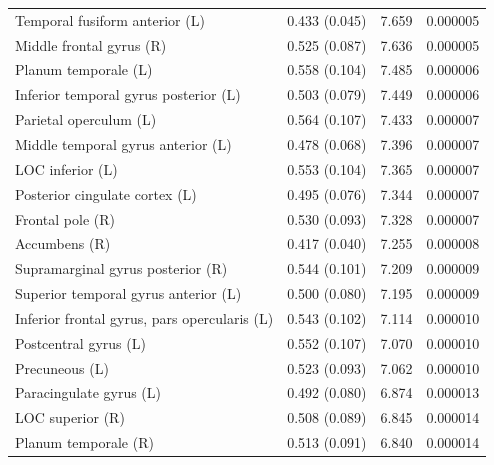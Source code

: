 \documentclass[jou,12pt,a4paper]{apa6}
\begin{document}
\begin{table}[ht]
\begin{threeparttable}
\begin{tabular*}{1\textwidth}{l @{\extracolsep{\fill}} lll}
Temporal fusiform anterior (L)      & 0.433 (0.045)               & 7.659            & 0.000005         \\
Middle frontal gyrus (R)                       & 0.525 (0.087)               & 7.636            & 0.000005         \\
Planum temporale (L)            & 0.558 (0.104)               & 7.485            & 0.000006         \\
Inferior temporal gyrus posterior (L)                  & 0.503 (0.079)               & 7.449            & 0.000006         \\
Parietal operculum (L)          & 0.564 (0.107)               & 7.433            & 0.000007         \\
Middle temporal gyrus anterior (L)                   & 0.478 (0.068)               & 7.396            & 0.000007         \\
LOC inferior (L)                   & 0.553 (0.104)               & 7.365            & 0.000007         \\
Posterior cingulate cortex (L)                        & 0.495 (0.076)               & 7.344            & 0.000007         \\
Frontal pole (R)               & 0.530 (0.093)               & 7.328            & 0.000007         \\
Accumbens (R)                 & 0.417 (0.040)               & 7.255            & 0.000008         \\
Supramarginal gyrus posterior (R) & 0.544 (0.101)               & 7.209            & 0.000009         \\
Superior temporal gyrus anterior (L)                   & 0.500 (0.080)               & 7.195            & 0.000009         \\
Inferior frontal gyrus, pars opercularis (L)       & 0.543 (0.102)               & 7.114            & 0.000010         \\
Postcentral gyrus (L)           & 0.552 (0.107)               & 7.070            & 0.000010         \\
Precuneous (L)            & 0.523 (0.093)               & 7.062            & 0.000010         \\
Paracingulate gyrus (L)         & 0.492 (0.080)               & 6.874            & 0.000013         \\
LOC superior (R)                  & 0.508 (0.089)               & 6.845            & 0.000014         \\
Planum temporale (R)           & 0.513 (0.091)               & 6.840            & 0.000014         \\

\end{tabular*}
\end{threeparttable}
\end{table}
\end{document}
